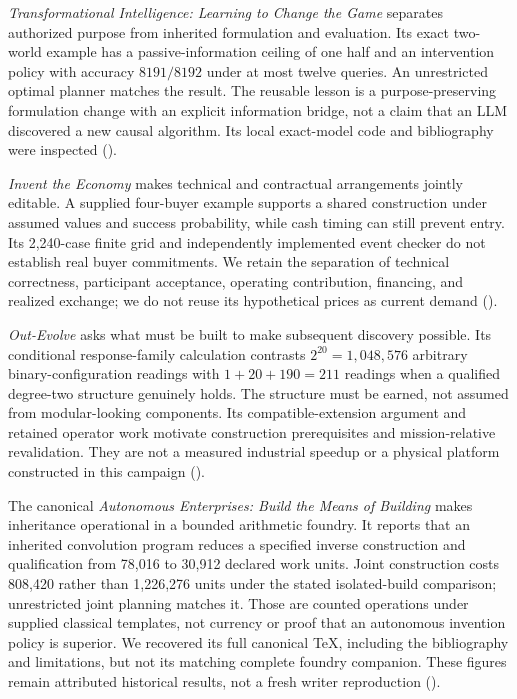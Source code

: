 \emph{Transformational Intelligence: Learning to Change the Game}
separates authorized purpose from inherited formulation and evaluation.
Its exact two-world example has a passive-information ceiling of one
half and an intervention policy with accuracy \(8191/8192\) under at
most twelve queries. An unrestricted optimal planner matches the result.
The reusable lesson is a purpose-preserving formulation change with an
explicit information bridge, not a claim that an LLM discovered a new
causal algorithm. Its local exact-model code and bibliography were
inspected ().

\emph{Invent the Economy} makes technical and contractual arrangements
jointly editable. A supplied four-buyer example supports a shared
construction under assumed values and success probability, while cash
timing can still prevent entry. Its 2,240-case finite grid and
independently implemented event checker do not establish real buyer
commitments. We retain the separation of technical correctness,
participant acceptance, operating contribution, financing, and realized
exchange; we do not reuse its hypothetical prices as current demand
().

\emph{Out-Evolve} asks what must be built to make subsequent discovery
possible. Its conditional response-family calculation contrasts
\(2^{20}=1,048,576\) arbitrary binary-configuration readings with
\(1+20+190=211\) readings when a qualified degree-two structure
genuinely holds. The structure must be earned, not assumed from
modular-looking components. Its compatible-extension argument and
retained operator work motivate construction prerequisites and
mission-relative revalidation. They are not a measured industrial
speedup or a physical platform constructed in this campaign
().

The canonical \emph{Autonomous Enterprises: Build the Means of Building}
makes inheritance operational in a bounded arithmetic foundry. It
reports that an inherited convolution program reduces a specified
inverse construction and qualification from 78,016 to 30,912 declared
work units. Joint construction costs 808,420 rather than 1,226,276 units
under the stated isolated-build comparison; unrestricted joint planning
matches it. Those are counted operations under supplied classical
templates, not currency or proof that an autonomous invention policy is
superior. We recovered its full canonical TeX, including the
bibliography and limitations, but not its matching complete foundry
companion. These figures remain attributed historical results, not a
fresh writer reproduction ().

